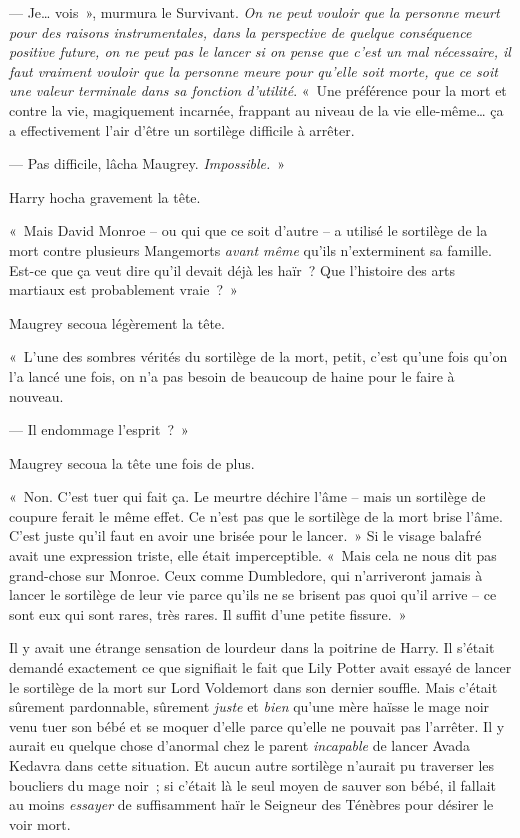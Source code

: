 --- Je… vois~», murmura le Survivant.
\emph{On ne peut vouloir que la personne meurt pour des raisons instrumentales, dans la perspective de quelque conséquence positive future, on ne peut pas le lancer si on pense que c'est un mal nécessaire, il faut vraiment vouloir que la personne meure pour qu'elle soit morte, que ce soit une valeur terminale dans sa fonction d'utilité}.
«~Une préférence pour la mort et contre la vie, magiquement incarnée, frappant au niveau de la vie elle-même… ça a effectivement l'air d'être un sortilège difficile à arrêter.

--- Pas difficile, lâcha Maugrey.
\emph{Impossible.}~»

Harry hocha gravement la tête.

«~Mais David Monroe -- ou qui que ce soit d'autre -- a utilisé le sortilège de la mort contre plusieurs Mangemorts \emph{avant même} qu'ils n'exterminent sa famille.
Est-ce que ça veut dire qu'il devait déjà les haïr~?
Que l'histoire des arts martiaux est probablement vraie~?~»

Maugrey secoua légèrement la tête.

«~L'une des sombres vérités du sortilège de la mort, petit, c'est qu'une fois qu'on l'a lancé une fois, on n'a pas besoin de beaucoup de haine pour le faire à nouveau.

--- Il endommage l'esprit~?~»

Maugrey secoua la tête une fois de plus.

«~Non. C'est tuer qui fait ça.
Le meurtre déchire l'âme -- mais un sortilège de coupure ferait le même effet.
Ce n'est pas que le sortilège de la mort brise l'âme.
C'est juste qu'il faut en avoir une brisée pour le lancer.~»
Si le visage balafré avait une expression triste, elle était imperceptible.
«~Mais cela ne nous dit pas grand-chose sur Monroe.
Ceux comme Dumbledore, qui n'arriveront jamais à lancer le sortilège de leur vie parce qu'ils ne se brisent pas quoi qu'il arrive -- ce sont eux qui sont rares, très rares.
Il suffit d'une petite fissure.~»

Il y avait une étrange sensation de lourdeur dans la poitrine de Harry.
Il s'était demandé exactement ce que signifiait le fait que Lily Potter avait essayé de lancer le sortilège de la mort sur Lord Voldemort dans son dernier souffle.
Mais c'était sûrement pardonnable, sûrement \emph{juste} et \emph{bien} qu'une mère haïsse le mage noir venu tuer son bébé et se moquer d'elle parce qu'elle ne pouvait pas l'arrêter.
Il y aurait eu quelque chose d'anormal chez le parent \emph{incapable} de lancer Avada Kedavra dans cette situation.
Et aucun autre sortilège n'aurait pu traverser les boucliers du mage noir~; si c'était là le seul moyen de sauver son bébé, il fallait au moins \emph{essayer} de suffisamment haïr le Seigneur des Ténèbres pour désirer le voir mort.

